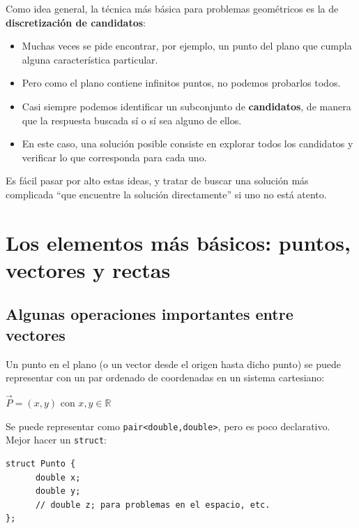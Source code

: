 \documentclass[compress]{beamer}
\begin{document}
\begin{frame}

Como idea general, la técnica más básica para problemas geométricos es la de \textbf{discretización de candidatos}:

\begin{itemize}
    \item Muchas veces se pide encontrar, por ejemplo, un punto del plano que cumpla alguna característica particular.
    \item Pero como el plano contiene infinitos puntos, no podemos probarlos todos.
    \item Casi siempre podemos identificar un subconjunto de \textbf{candidatos}, de manera que la respuesta buscada sí o sí sea alguno de ellos.
    \item En este caso, una solución posible consiste en explorar todos los candidatos y verificar lo que corresponda para cada uno.
\end{itemize}

Es fácil pasar por alto estas ideas, y tratar de buscar una solución más complicada ``que encuentre la solución directamente'' si uno no está atento.

\end{frame}


\section{Los elementos m\'as b\'asicos: puntos, vectores y rectas}

\subsection{Algunas operaciones importantes entre vectores}

\begin{frame}[fragile]
Un punto en el plano (o un vector desde el origen hasta dicho punto) se puede representar con un par ordenado de coordenadas en un sistema cartesiano:

\begin{center}
$\vec{P} = (x,y)$ con $x,y \in \mathbb{R}$
\end{center}

\bigskip

Se puede representar como {\tt pair<double,double>}, pero es poco declarativo. Mejor hacer un {\tt struct}:

\begin{lstlisting}
struct Punto {
      double x;
      double y;
      // double z; para problemas en el espacio, etc.
};
\end{lstlisting}

\end{frame}
\end{document}
